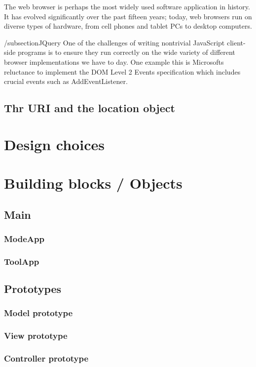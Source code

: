 \documentclass[english]{ifimaster}
\begin{document}
The web browser is perhaps the most widely used software application in history.
It has evolved significantly over the past fifteen years; today, web browsers
run on diverse types of hardware, from cell phones and tablet PCs to desktop
computers.\parencite[p. 2]{gross}

/subsection{JQuery}
One of the challenges of writing nontrivial JavaScript client-side programs is to ensure they run correctly on the wide variety of different browser implementations we have to day\parencite[p. 325]{flanagan}. One example this is Microsofts reluctance to implement the DOM Level 2 Events specification which includes crucial events such as AddEventListener. 

\subsection{Thr URI and the location object}
\section{Design choices}
\section{Building blocks / Objects}
\subsection{Main}
\subsubsection{ModeApp}
\subsubsection{ToolApp}

\subsection{Prototypes}
\subsubsection{Model prototype}
\subsubsection{View prototype}
\subsubsection{Controller prototype}
\end{document}
